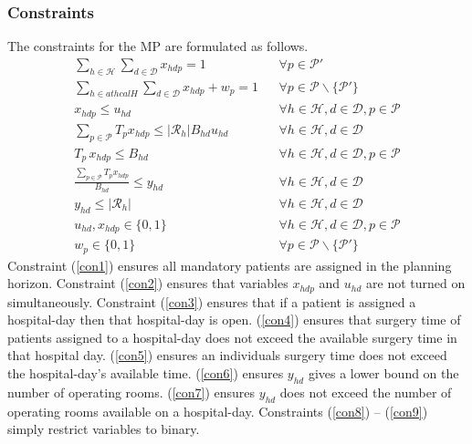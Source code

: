\subsubsection*{Constraints} The constraints for the MP are formulated as follows.
\begin{align}
    \sum\limits_{h \in \mathcal{H}} \sum\limits_{d \in \mathcal{D}}x_{hdp} = 1 
        && \forall p \in \mathcal{P}' \label{con1}\\
    \sum\limits_{h \in athcal{H}} \sum\limits_{d \in \mathcal{D}} x_{hdp} + w_p = 1
        && \forall p \in \mathcal{P} \backslash \{\mathcal{P}'\}\label{con2}\\
    x_{hdp} \leq u_{hd}
        && \forall h \in \mathcal{H}, d \in \mathcal{D}, p \in \mathcal{P}\label{con3}\\
    \sum\limits_{p \in \mathcal{P}}T_px_{hdp} \leq |\mathcal{R}_h|B_{hd}u_{hd}
        && \forall h \in \mathcal{H}, d \in \mathcal{D} \label{con4}\\
    T_p\,x_{hdp} \leq B_{hd} 
        && \forall h \in \mathcal{H}, d \in \mathcal{D}, p \in \mathcal{P}\label{con5}\\
     \frac{\sum_{p \in \mathcal{P}}T_px_{hdp}}{B_{hd}} \leq y_{hd}
        && \forall h \in \mathcal{H}, d\in \mathcal{D} \label{con6}\\
        y_{hd} \leq |\mathcal{R}_h|
        && \forall h\in\mathcal{H}, d \in \mathcal{D} \label{con7}\\
        u_{hd}, x_{hdp} \in \{ 0,1\}
        && \forall h\in \mathcal{H}, d \in \mathcal{D}, p \in \mathcal{P}\label{con8}\\
        w_p \in \{0,1\}
        && \forall p \in \mathcal{P} \backslash\{\mathcal{P}'\}\label{con9}
\end{align}
Constraint (\ref{con1}) ensures all mandatory patients are assigned in the planning 
horizon. Constraint (\ref{con2}) ensures that variables $x_{hdp}$ and $u_{hd}$ are not
turned on simultaneously. Constraint (\ref{con3}) ensures that if a patient is assigned
a hospital-day then that hospital-day is open. (\ref*{con4}) ensures that surgery time 
of patients assigned to a hospital-day does not exceed the available surgery time in
that hospital day. (\ref*{con5}) ensures an individuals surgery time does not exceed 
the hospital-day's available time. (\ref*{con6}) ensures $y_{hd}$ gives a lower bound 
on the number of operating rooms. (\ref*{con7}) ensures $y_{hd}$ does not exceed the
number of operating rooms available on a hospital-day. Constraints (\ref*{con8}) -- (\ref*{con9}) simply restrict
variables to binary.

